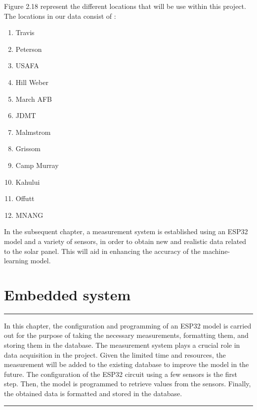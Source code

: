 \documentclass{report}
\begin{document}
Figure 2.18 represent the different locations that will be use within this project.\\
\newpage
The locations in our data consist of :
\begin{enumerate}
    \item Travis
    \item Peterson
    \item USAFA
    \item Hill Weber
    \item March AFB
    \item JDMT
    \item Malmstrom
    \item Grissom
    \item Camp Murray
    \item Kahului
    \item Offutt
    \item MNANG
\end{enumerate}
In the subsequent chapter, a measurement system is established using an ESP32 model and a variety of sensors, in order to obtain new and realistic data related to the solar panel. This will aid in enhancing the accuracy of the machine-learning model.\\
\chapter{Embedded system}
\noindent\rule{13cm}{1.2pt}\hfill \break
In this chapter, the configuration and programming of an ESP32 model is carried out for the purpose of taking the necessary measurements, formatting them, and storing them in the database. The measurement system plays a crucial role in data acquisition in the project. Given the limited time and resources, the measurement will be added to the existing database to improve the model in the future. The configuration of the ESP32 circuit using a few sensors is the first step. Then, the model is programmed to retrieve values from the sensors. Finally, the obtained data is formatted and stored in the database.
\hfill \break
\noindent\rule{13cm}{1.2pt}

\newpage
\hfill \break
\end{document}
